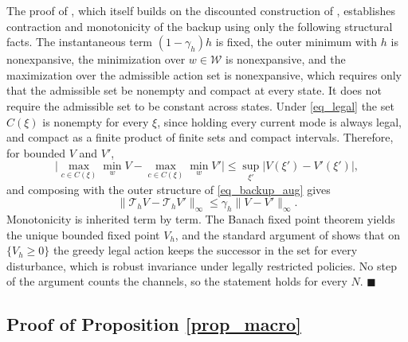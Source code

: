 \documentclass[journal]{IEEEtran}
\begin{document}
The proof of \cite[Theorems~2 and~3]{li2023cdc}, which itself builds on the discounted construction of \cite{fisac2019}, establishes contraction and monotonicity of the backup using only the following structural facts. The instantaneous term $(1-\gamma_h)h$ is fixed, the outer minimum with $h$ is nonexpansive, the minimization over $w \in \mathcal{W}$ is nonexpansive, and the maximization over the admissible action set is nonexpansive, which requires only that the admissible set be nonempty and compact at every state. It does not require the admissible set to be constant across states. Under \eqref{eq_legal} the set $C(\xi)$ is nonempty for every $\xi$, since holding every current mode is always legal, and compact as a finite product of finite sets and compact intervals. Therefore, for bounded $V$ and $V'$,
\begin{equation}
\bigl| \max_{c \in C(\xi)} \min_{w} V - \max_{c \in C(\xi)} \min_{w} V' \bigr| \le \sup_{\xi'} |V(\xi') - V'(\xi')|,
\end{equation}
and composing with the outer structure of \eqref{eq_backup_aug} gives
\begin{equation}
\|\mathcal{T}_h V - \mathcal{T}_h V'\|_\infty \le \gamma_h \|V - V'\|_\infty .
\end{equation}
Monotonicity is inherited term by term. The Banach fixed point theorem yields the unique bounded fixed point $V_h$, and the standard argument of \cite{li2023cdc} shows that on $\{V_h \ge 0\}$ the greedy legal action keeps the successor in the set for every disturbance, which is robust invariance under legally restricted policies. No step of the argument counts the channels, so the statement holds for every $N$. $\blacksquare$

\subsection{Proof of Proposition \ref{prop_macro}}
\end{document}
